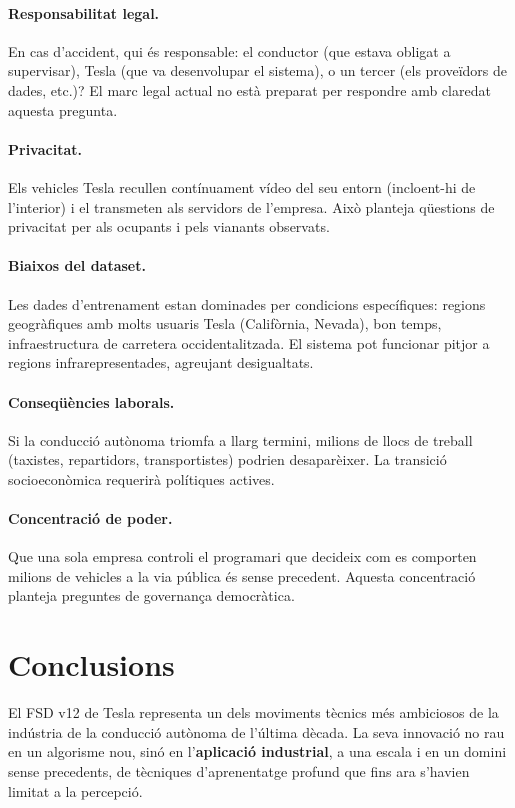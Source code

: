 \documentclass[11pt,a4paper]{article}
\begin{document}
\paragraph{Responsabilitat legal.} En cas d'accident, qui és responsable: el conductor (que estava obligat a supervisar), Tesla (que va desenvolupar el sistema), o un tercer (els proveïdors de dades, etc.)? El marc legal actual no està preparat per respondre amb claredat aquesta pregunta.

\paragraph{Privacitat.} Els vehicles Tesla recullen contínuament vídeo del seu entorn (incloent-hi de l'interior) i el transmeten als servidors de l'empresa. Això planteja qüestions de privacitat per als ocupants i pels vianants observats.

\paragraph{Biaixos del dataset.} Les dades d'entrenament estan dominades per condicions específiques: regions geogràfiques amb molts usuaris Tesla (Califòrnia, Nevada), bon temps, infraestructura de carretera occidentalitzada. El sistema pot funcionar pitjor a regions infrarepresentades, agreujant desigualtats.

\paragraph{Conseqüències laborals.} Si la conducció autònoma triomfa a llarg termini, milions de llocs de treball (taxistes, repartidors, transportistes) podrien desaparèixer. La transició socioeconòmica requerirà polítiques actives.

\paragraph{Concentració de poder.} Que una sola empresa controli el programari que decideix com es comporten milions de vehicles a la via pública és sense precedent. Aquesta concentració planteja preguntes de governança democràtica.

\section{Conclusions}

El FSD v12 de Tesla representa un dels moviments tècnics més ambiciosos de la indústria de la conducció autònoma de l'última dècada. La seva innovació no rau en un algorisme nou, sinó en l'\textbf{aplicació industrial}, a una escala i en un domini sense precedents, de tècniques d'aprenentatge profund que fins ara s'havien limitat a la percepció.
\end{document}
